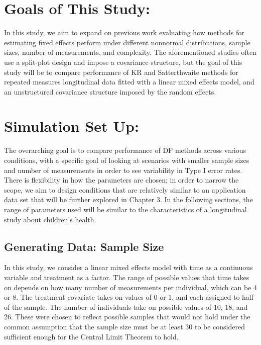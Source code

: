 \documentclass[12pt, twoside]{amherstthesis}
\begin{document}
\hypertarget{goals-of-this-study}{%
\section{Goals of This Study:}\label{goals-of-this-study}}

In this study, we aim to expand on previous work evaluating how methods for estimating fixed effects perform under different nonnormal distributions, sample sizes, number of measurements, and complexity. The aforementioned studies often use a split-plot design and impose a covariance structure, but the goal of this study will be to compare performance of KR and Satterthwaite methods for repeated measures longitudinal data fitted with a linear mixed effects model, and an unstructured covariance structure imposed by the random effects.

\hypertarget{simulation-set-up}{%
\section{Simulation Set Up:}\label{simulation-set-up}}

The overarching goal is to compare performance of DF methods across various conditions, with a specific goal of looking at scenarios with smaller sample sizes and number of measurements in order to see variability in Type I error rates. There is flexibility in how the parameters are chosen; in order to narrow the scope, we aim to design conditions that are relatively similar to an application data set that will be further explored in Chapter 3. In the following sections, the range of parameters used will be similar to the characteristics of a longitudinal study about children's health.

\hypertarget{generating-data-sample-size}{%
\subsection{Generating Data: Sample Size}\label{generating-data-sample-size}}

In this study, we consider a linear mixed effects model with time as a continuous variable and treatment as a factor. The range of possible values that time takes on depends on how many number of measurements per individual, which can be 4 or 8. The treatment covariate takes on values of 0 or 1, and each assigned to half of the sample. The number of individuals take on possible values of 10, 18, and 26. These were chosen to reflect possible samples that would not hold under the common assumption that the sample size must be at least 30 to be considered sufficient enough for the Central Limit Theorem to hold.
\end{document}
